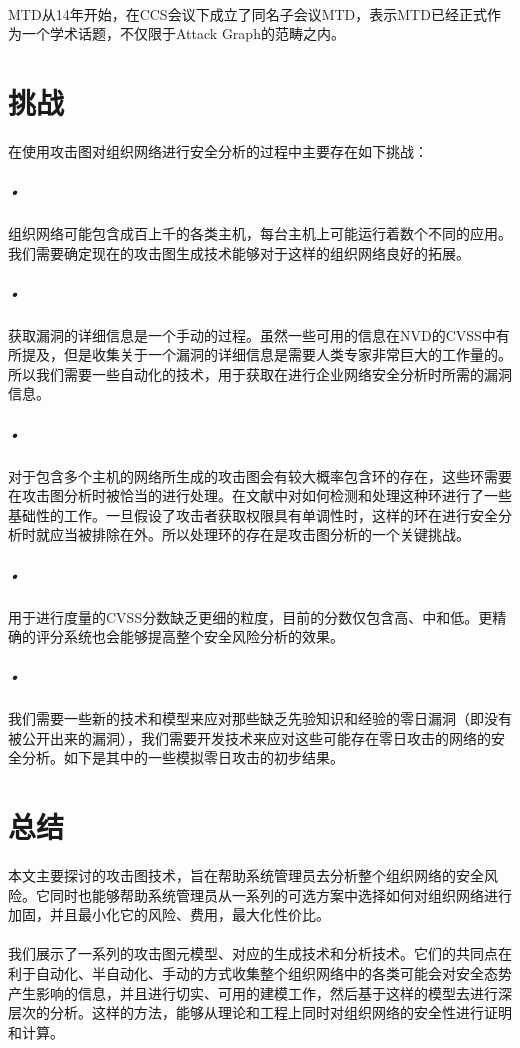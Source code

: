 \documentclass[12pt,a4paper]{article}
\begin{document}
\paragraph{}
MTD从14年开始，在CCS会议下成立了同名子会议MTD，表示MTD已经正式作为一个学术话题，不仅限于Attack Graph的范畴之内。

\section{挑战}
\paragraph{}
在使用攻击图对组织网络进行安全分析的过程中主要存在如下挑战：
\subparagraph{•}
组织网络可能包含成百上千的各类主机，每台主机上可能运行着数个不同的应用。我们需要确定现在的攻击图生成技术能够对于这样的组织网络良好的拓展。
\subparagraph{•}
获取漏洞的详细信息是一个手动的过程。虽然一些可用的信息在NVD的CVSS中有所提及，但是收集关于一个漏洞的详细信息是需要人类专家非常巨大的工作量的。所以我们需要一些自动化的技术，用于获取在进行企业网络安全分析时所需的漏洞信息。
\subparagraph{•}
对于包含多个主机的网络所生成的攻击图会有较大概率包含环的存在，这些环需要在攻击图分析时被恰当的进行处理。在文献\cite{24}\cite{25}中对如何检测和处理这种环进行了一些基础性的工作。一旦假设了攻击者获取权限具有单调性时，这样的环在进行安全分析时就应当被排除在外。所以处理环的存在是攻击图分析的一个关键挑战。
\subparagraph{•}
用于进行度量的CVSS分数缺乏更细的粒度，目前的分数仅包含高、中和低。更精确的评分系统也会能够提高整个安全风险分析的效果。
\subparagraph{•}
我们需要一些新的技术和模型来应对那些缺乏先验知识和经验的零日漏洞（即没有被公开出来的漏洞），我们需要开发技术来应对这些可能存在零日攻击的网络的安全分析。如下是其中的一些模拟零日攻击的初步结果\cite{26}。


\section{总结}
\paragraph{}
本文主要探讨的攻击图技术，旨在帮助系统管理员去分析整个组织网络的安全风险。它同时也能够帮助系统管理员从一系列的可选方案中选择如何对组织网络进行加固，并且最小化它的风险、费用，最大化性价比。
\paragraph{}
我们展示了一系列的攻击图元模型、对应的生成技术和分析技术。它们的共同点在利于自动化、半自动化、手动的方式收集整个组织网络中的各类可能会对安全态势产生影响的信息，并且进行切实、可用的建模工作，然后基于这样的模型去进行深层次的分析。这样的方法，能够从理论和工程上同时对组织网络的安全性进行证明和计算。
\end{document}
